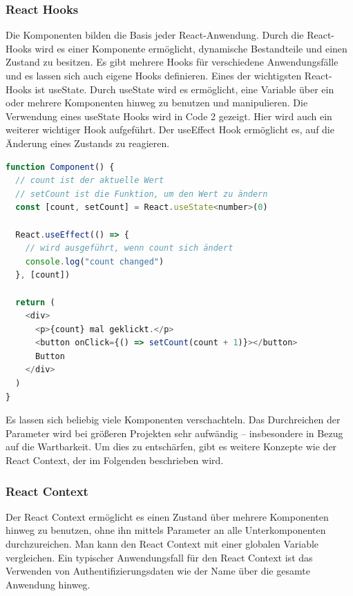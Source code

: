 \subsubsection{React Hooks}
\label{sub:reactHooks}
Die Komponenten bilden die Basis jeder React-Anwendung. Durch die React-Hooks wird es einer Komponente ermöglicht, dynamische Bestandteile und einen Zustand zu besitzen. Es gibt mehrere Hooks für verschiedene Anwendungsfälle und es lassen sich auch eigene Hooks definieren. Eines der wichtigsten React-Hooks ist useState. Durch useState wird es ermöglicht, eine Variable über ein oder mehrere Komponenten hinweg zu benutzen und manipulieren. Die Verwendung eines useState Hooks wird in Code 2 gezeigt. Hier wird auch ein weiterer wichtiger Hook aufgeführt. Der useEffect Hook ermöglicht es, auf die Änderung eines Zustands zu reagieren.

\begin{lstlisting}[language=JavaScript, label=reactComponentHooks, title={Beispiel einer React-Komponente mit Hooks}]
function Component() {
  // count ist der aktuelle Wert
  // setCount ist die Funktion, um den Wert zu ändern
  const [count, setCount] = React.useState<number>(0)

  React.useEffect(() => {
    // wird ausgeführt, wenn count sich ändert
    console.log("count changed")
  }, [count])

  return (
    <div>
      <p>{count} mal geklickt.</p>
      <button onClick={() => setCount(count + 1)}></button>
      Button
    </div>
  )
}
\end{lstlisting}

Es lassen sich beliebig viele Komponenten verschachteln. Das Durchreichen der Parameter wird bei größeren Projekten sehr aufwändig – insbesondere in Bezug auf die Wartbarkeit. Um dies zu entschärfen, gibt es weitere Konzepte wie der React Context, der im Folgenden beschrieben wird.

\subsubsection{React Context}
\label{sub:reactContext}

Der React Context ermöglicht es einen Zustand über mehrere Komponenten hinweg zu benutzen, ohne ihn mittels Parameter an alle Unterkomponenten durchzureichen. Man kann den React Context mit einer globalen Variable vergleichen.
Ein typischer Anwendungsfall für den React Context ist das Verwenden von Authentifizierungsdaten wie der Name über die gesamte Anwendung hinweg.

